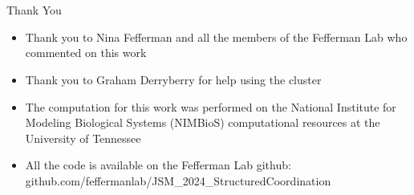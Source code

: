 \documentclass{beamer}
\begin{document}
\section*{}
\begin{frame}{Thank You}
	\begin{itemize}
		\item Thank you to Nina Fefferman and all the members of the Fefferman Lab who commented on this work
		\item Thank you to Graham Derryberry for help using the cluster
		\item The computation for this work was performed on the National Institute for Modeling Biological Systems (NIMBioS) computational resources at the University of Tennessee
		\item All the code is available on the Fefferman Lab github: github.com/feffermanlab/JSM\_2024\_StructuredCoordination
	\end{itemize}
\end{frame}
\end{document}
